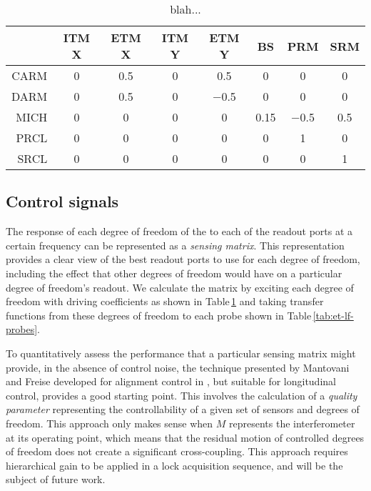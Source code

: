 \begin{table}
  \centering
  \begin{tabular}{r|ccccccc}
    & \textbf{\gls{ITM} X} & \textbf{\gls{ETM} X} & \textbf{\gls{ITM} Y} & \textbf{\gls{ETM} Y} & \textbf{\gls{BS}} & \textbf{\gls{PRM}} & \textbf{\gls{SRM}} \\
    \hline
    \gls{CARM} & \num{0} & \num{0.5} & \num{0} & \num{0.5} & \num{0} & \num{0} & \num{0} \\
    \gls{DARM} & \num{0} & \num{0.5} & \num{0} & \num{-0.5} & \num{0} & \num{0} & \num{0} \\
    \gls{MICH} & \num{0} & \num{0} & \num{0} & \num{0} & \num{0.15} & \num{-0.5} & \num{0.5} \\
    \gls{PRCL} & \num{0} & \num{0} & \num{0} & \num{0} & \num{0} & \num{1} & \num{0} \\
    \gls{SRCL} & \num{0} & \num{0} & \num{0} & \num{0} & \num{0} & \num{0} & \num{1} \\
  \end{tabular}
  \caption{\label{tab:et-lf-driving-coefficients}blah...}
\end{table}

\subsection{Control signals}
The response of each degree of freedom of the \DRFPMI{} to each of the readout ports at a certain frequency can be represented as a \emph{sensing matrix}. This representation provides a clear view of the best readout ports to use for each degree of freedom, including the effect that other degrees of freedom would have on a particular degree of freedom's readout. We calculate the matrix by exciting each degree of freedom with driving coefficients as shown in Table\,\ref{tab:et-lf-driving-coefficients} and taking transfer functions from these degrees of freedom to each probe shown in Table\,\ref{tab:et-lf-probes}.

To quantitatively assess the performance that a particular sensing matrix might provide, in the absence of control noise, the technique presented by Mantovani and Freise \cite{Mantovani2008} developed for alignment control in \VIRGO{}, but suitable for longitudinal control, provides a good starting point. This involves the calculation of a \emph{quality parameter} representing the controllability of a given set of sensors and degrees of freedom. This approach only makes sense when $M$ represents the interferometer at its operating point, which means that the residual motion of controlled degrees of freedom does not create a significant cross-coupling. This approach requires hierarchical gain to be applied in a lock acquisition sequence, and will be the subject of future work.

